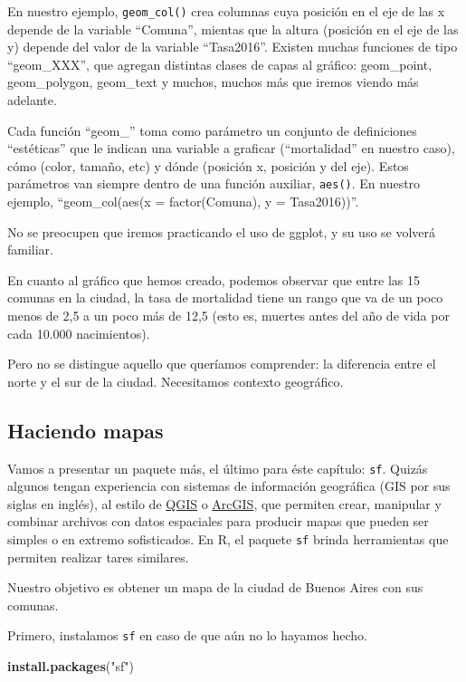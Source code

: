 \documentclass[spanish,]{book}
\newenvironment{Shaded}{\begin{snugshade}}{\end{snugshade}}
\newcommand{\KeywordTok}[1]{\textcolor[rgb]{0.13,0.29,0.53}{\textbf{#1}}}
\newcommand{\NormalTok}[1]{#1}
\newcommand{\StringTok}[1]{\textcolor[rgb]{0.31,0.60,0.02}{#1}}
\begin{document}
En nuestro ejemplo, \texttt{geom\_col()} crea columnas cuya posición en el eje de las x depende de la variable ``Comuna'', mientas que la altura (posición en el eje de las y) depende del valor de la variable ``Tasa2016''. Existen muchas funciones de tipo ``geom\_XXX'', que agregan distintas clases de capas al gráfico: geom\_point, geom\_polygon, geom\_text y muchos, muchos más que iremos viendo más adelante.

Cada función ``geom\_'' toma como parámetro un conjunto de definiciones ``estéticas'' que le indican una variable a graficar (``mortalidad'' en nuestro caso), cómo (color, tamaño, etc) y dónde (posición x, posición y del eje). Estos parámetros van siempre dentro de una función auxiliar, \texttt{aes()}. En nuestro ejemplo, ``geom\_col(aes(x = factor(Comuna), y = Tasa2016))''.

No se preocupen que iremos practicando el uso de ggplot, y su uso se volverá familiar.

En cuanto al gráfico que hemos creado, podemos observar que entre las 15 comunas en la ciudad, la tasa de mortalidad tiene un rango que va de un poco menos de 2,5 a un poco más de 12,5 (esto es, muertes antes del año de vida por cada 10.000 nacimientos).

Pero no se distingue aquello que queríamos comprender: la diferencia entre el norte y el sur de la ciudad. Necesitamos contexto geográfico.

\hypertarget{haciendo-mapas}{%
\subsection{Haciendo mapas}\label{haciendo-mapas}}

Vamos a presentar un paquete más, el último para éste capítulo: \texttt{sf}. Quizás algunos tengan experiencia con sistemas de información geográfica (GIS por sus siglas en inglés), al estilo de \href{https://qgis.org/en/site/}{QGIS} o \href{https://www.arcgis.com/features/index.html}{ArcGIS}, que permiten crear, manipular y combinar archivos con datos espaciales para producir mapas que pueden ser simples o en extremo sofisticados. En R, el paquete \texttt{sf} brinda herramientas que permiten realizar tares similares.

Nuestro objetivo es obtener un mapa de la ciudad de Buenos Aires con sus comunas.

Primero, instalamos \texttt{sf} en caso de que aún no lo hayamos hecho.

\begin{Shaded}
\begin{Highlighting}[]
\KeywordTok{install.packages}\NormalTok{(}\StringTok{"sf"}\NormalTok{)}
\end{Highlighting}
\end{Shaded}
\end{document}
